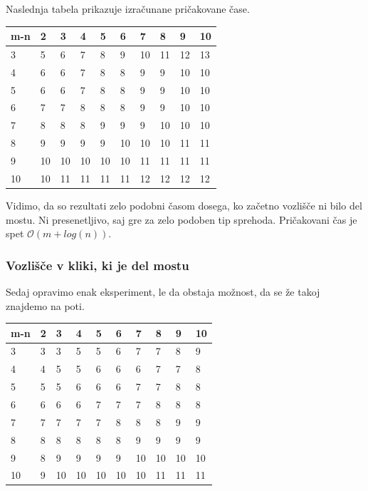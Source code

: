 \documentclass[12pt,a4paper]{amsart}
\begin{document}
Naslednja tabela prikazuje izračunane pričakovane čase.

\newpage

\begin{table}[!ht]
    \centering
    \begin{tabular}{|l|l|l|l|l|l|l|l|l|l|}
    \hline
        m-n & 2 & 3 & 4 & 5 & 6 & 7 & 8 & 9 & 10 \\ \hline
        3 & 5 & 6 & 7 & 8 & 9 & 10 & 11 & 12 & 13 \\ \hline
        4 & 6 & 6 & 7 & 8 & 8 & 9 & 9 & 10 & 10 \\ \hline
        5 & 6 & 6 & 7 & 8 & 8 & 9 & 9 & 10 & 10 \\ \hline
        6 & 7 & 7 & 8 & 8 & 8 & 9 & 9 & 10 & 10 \\ \hline
        7 & 8 & 8 & 8 & 9 & 9 & 9 & 10 & 10 & 10 \\ \hline
        8 & 9 & 9 & 9 & 9 & 10 & 10 & 10 & 11 & 11 \\ \hline
        9 & 10 & 10 & 10 & 10 & 10 & 11 & 11 & 11 & 11 \\ \hline
        10 & 10 & 11 & 11 & 11 & 11 & 12 & 12 & 12 & 12 \\ \hline
    \end{tabular}
\end{table}

Vidimo, da so rezultati zelo podobni časom dosega, ko začetno vozlišče ni bilo del mostu. Ni presenetljivo, saj gre
za zelo podoben tip sprehoda. Pričakovani čas je spet $\mathcal{O}(m+log(n))$.

\subsubsection{Vozlišče v kliki, ki je del mostu}

Sedaj opravimo enak eksperiment, le da obstaja možnost, da se že takoj znajdemo na poti.

\begin{table}[!ht]
    \centering
    \begin{tabular}{|l|l|l|l|l|l|l|l|l|l|}
    \hline
        m-n & 2 & 3 & 4 & 5 & 6 & 7 & 8 & 9 & 10 \\ \hline
        3 & 3 & 3 & 5 & 5 & 6 & 7 & 7 & 8 & 9 \\ \hline
        4 & 4 & 5 & 5 & 6 & 6 & 6 & 7 & 7 & 8 \\ \hline
        5 & 5 & 5 & 6 & 6 & 6 & 7 & 7 & 8 & 8 \\ \hline
        6 & 6 & 6 & 6 & 7 & 7 & 7 & 8 & 8 & 8 \\ \hline
        7 & 7 & 7 & 7 & 7 & 8 & 8 & 8 & 9 & 9 \\ \hline
        8 & 8 & 8 & 8 & 8 & 8 & 9 & 9 & 9 & 9 \\ \hline
        9 & 8 & 9 & 9 & 9 & 9 & 10 & 10 & 10 & 10 \\ \hline
        10 & 9 & 10 & 10 & 10 & 10 & 10 & 11 & 11 & 11 \\ \hline
    \end{tabular}
\end{table}
\end{document}
